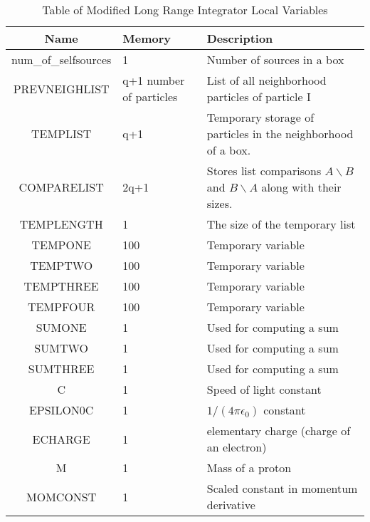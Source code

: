\documentclass[oneside,12pt]{book}
\begin{document}
\begin{center}
\begin{table}[ht]
\begin{tabular}{|c|p{1in}|p{3.5in}|}
\hline
\textbf{Name} & \textbf{Memory} & \textbf{Description}\\
\hline
num\_of\_selfsources & 1 & Number of sources in a box\\
\hline
PREVNEIGHLIST & q+1 number of particles & List of all neighborhood particles of particle I\\
\hline
TEMPLIST & q+1 & Temporary storage of particles in the neighborhood of a box.\\
\hline
COMPARELIST & 2q+1 & Stores list comparisons $A \backslash B$ and $B \backslash A$ along with their sizes.\\
\hline
TEMPLENGTH & 1 & The size of the temporary list\\
\hline
TEMPONE & 100 & Temporary variable\\
\hline
TEMPTWO & 100 & Temporary variable\\
\hline
TEMPTHREE & 100 & Temporary variable\\
\hline
TEMPFOUR & 100 & Temporary variable\\
\hline
SUMONE & 1 & Used for computing a sum\\
\hline
SUMTWO & 1 & Used for computing a sum\\
\hline
SUMTHREE & 1 & Used for computing a sum\\
\hline
C & 1 & Speed of light constant\\
\hline
EPSILON0C & 1 & $1 \slash (4 \pi \epsilon_0)$ constant\\
\hline
ECHARGE & 1 & elementary charge (charge of an electron)\\
\hline
M & 1 & Mass of a proton\\
\hline
MOMCONST & 1 & Scaled constant in momentum derivative\\
\hline
\end{tabular}
\caption{Table of Modified Long Range Integrator Local Variables}
\end{table}
\end{center}
\end{document}
